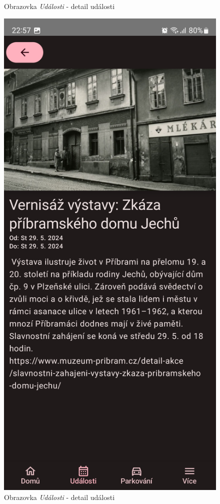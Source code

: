 \begin{figure}[H]
    \caption{Obrazovka \textit{Události} - detail události}
  \endminipage\hfill
    \includegraphics[width=\linewidth]{screens/2c_B.jpg}
    \caption{Obrazovka \textit{Události} - detail události}
  \endminipage\hfill
\end{figure}


